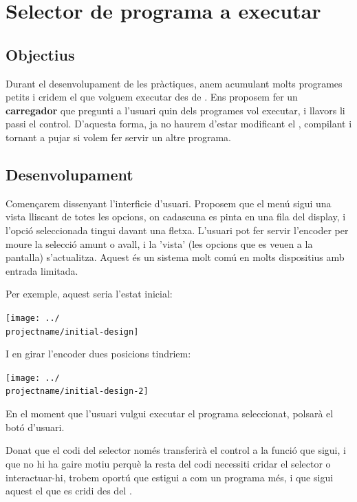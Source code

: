 \chapter{Selector de programa a executar} \label{ch:selector}

\section{Objectius}

Durant el desenvolupament de les pràctiques, anem acumulant molts programes
petits i cridem el que volguem executar des de . Ens proposem
fer un \textbf{carregador} que pregunti a l'usuari quin dels programes
vol executar, i llavors li passi el control. D'aquesta forma, ja no haurem
d'estar modificant el , compilant i tornant a pujar si volem
fer servir un altre programa.

\section{Desenvolupament}

Començarem dissenyant l'interficie d'usuari. Proposem que el menú sigui una
vista lliscant de totes les opcions, on cadascuna es pinta en una fila
del display, i l'opció seleccionada tingui davant una fletxa. L'usuari pot
fer servir l'encoder per moure la selecció amunt o avall, i la 'vista'
(les opcions que es veuen a la pantalla) s'actualitza. Aquest és un sistema
molt comú en molts dispositius amb entrada limitada.

Per exemple, aquest seria l'estat inicial:
%
\begin{center}
  \texttt{[image: ../\\projectname/initial-design]}
\end{center}
%
I en girar l'encoder dues posicions tindriem:
%
\begin{center}
  \texttt{[image: ../\\projectname/initial-design-2]}
\end{center}

En el moment que l'usuari vulgui executar el programa seleccionat, polsarà
el botó d'usuari.

Donat que el codi del selector només transferirà el control a la funció que
sigui, i que no hi ha gaire motiu perquè la resta del codi necessiti cridar
el selector o interactuar-hi, trobem oportú que estigui a 
com un programa més, i que sigui aquest el que es cridi des del .

